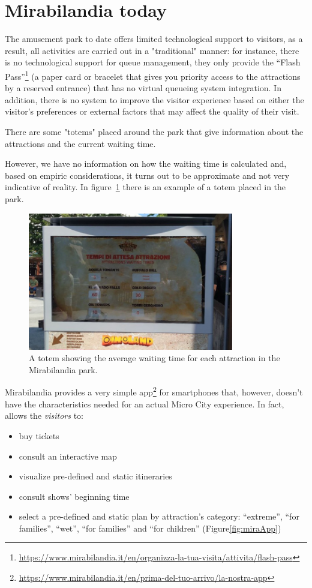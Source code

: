 \section{Mirabilandia today}\label{sec:mirabilandia-today}
The amusement park to date offers limited technological support to visitors, as a result, all activities are carried out in a "traditional" manner:
for instance, there is no technological support for queue management, they only provide the
``Flash Pass''\footnote{\url{https://www.mirabilandia.it/en/organizza-la-tua-visita/attivita/flash-pass}} (a paper card or bracelet that gives you
priority access to the attractions by a reserved entrance) that has no virtual queueing system integration.
In addition, there is no system to improve the visitor experience based on either the visitor's preferences or external factors that may affect the
quality of their visit.

There are some "totems" placed around the park that give information about the attractions and the current waiting time.

However, we have no information on how the waiting time is calculated and, based on empiric considerations, it turns out to be approximate and not very indicative of reality.
In figure~\ref{fig:mira-totem} there is an example of a totem placed in the park.

\begin{figure}[H]
	\centering
	\includegraphics[width=0.8\textwidth]{img/mira-totem.jpg}
	\caption{A totem showing the average waiting time for each attraction in the Mirabilandia park.}
	\label{fig:mira-totem}
\end{figure}

Mirabilandia provides a very simple app\footnote{\url{https://www.mirabilandia.it/en/prima-del-tuo-arrivo/la-nostra-app}} for smartphones that, however, doesn't have the characteristics needed for an actual Micro City experience.
In fact, allows the \textit{visitors} to:
\begin{itemize}
	\item buy tickets
	\item consult an interactive map
	\item visualize pre-defined and static itineraries
	\item consult shows' beginning time
	\item select a pre-defined and static plan by attraction's category: ``extreme'', ``for families'', ``wet'', ``for families'' and ``for children'' (Figure\ref{fig:miraApp})
\end{itemize}

